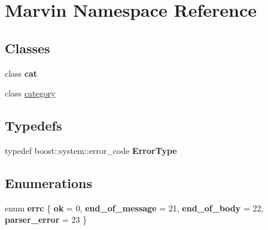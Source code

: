 \hypertarget{namespace_marvin}{}\section{Marvin Namespace Reference}
\label{namespace_marvin}
\subsection*{Classes}
\begin{DoxyCompactItemize}
\item 
class {\bfseries cat}
\item 
class \hyperlink{class_marvin_1_1category}{category}
\end{DoxyCompactItemize}
\subsection*{Typedefs}
\begin{DoxyCompactItemize}
\item 
\mbox{\label{namespace_marvin_a637f2b801ade30181b82ef5335fc3ee5}} 
typedef boost\+::system\+::error\+\_\+code {\bfseries Error\+Type}
\end{DoxyCompactItemize}
\subsection*{Enumerations}
\begin{DoxyCompactItemize}
\item 
\mbox{\label{namespace_marvin_a5596d24f2a56d9332f0f9ccb4ea19c9d}} 
enum {\bfseries errc} \{ {\bfseries ok} = 0, 
{\bfseries end\+\_\+of\+\_\+message} = 21, 
{\bfseries end\+\_\+of\+\_\+body} = 22, 
{\bfseries parser\+\_\+error} = 23
 \}
\end{DoxyCompactItemize}
